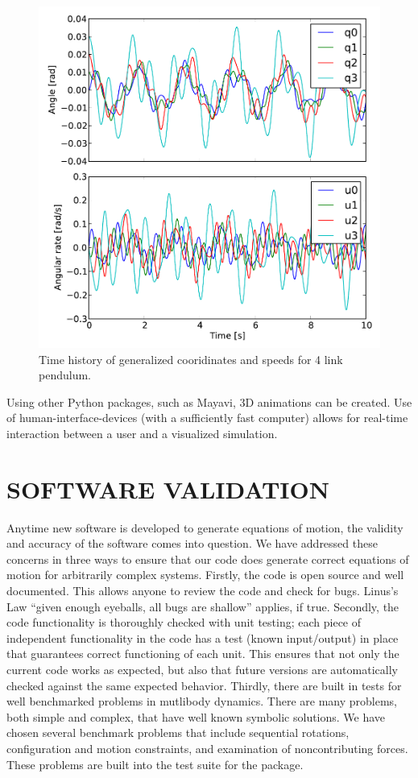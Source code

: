 \documentclass[twocolumn,10pt]{asme2e}
\begin{document}
\begin{figure}
  \includegraphics[width=\columnwidth]{four_link_pendulum_time_series}
  \caption{Time history of generalized cooridinates and speeds for 4 link
pendulum.}
  \label{fig:time_series}
\end{figure}

Using other Python packages, such as Mayavi, 3D animations can be created. Use
of human-interface-devices (with a sufficiently fast computer) allows for
real-time interaction between a user and a visualized simulation.

\section*{SOFTWARE VALIDATION}
Anytime new software is developed to generate equations of motion, the validity
and accuracy of the software comes into question. We have addressed these
concerns in three ways to ensure that our code does generate correct equations
of motion for arbitrarily complex systems. Firstly, the code is open source and
well documented. This allows anyone to review the code and check for bugs.
Linus's Law ``given enough eyeballs, all bugs are shallow'' \cite{Raymond1999}
applies, if true. Secondly, the code functionality is thoroughly checked with
unit testing; each piece of independent functionality in the code has a test
(known input/output) in place that guarantees correct functioning of each unit.
This ensures that not only the current code works as expected, but also that
future versions are automatically checked against the same expected behavior.
Thirdly, there are built in tests for well benchmarked problems in mutlibody
dynamics. There are many problems, both simple and complex, that have well
known symbolic solutions. We have chosen several benchmark problems that
include sequential rotations, configuration and motion constraints, and
examination of noncontributing forces. These problems are built into the test
suite for the package.
\end{document}
